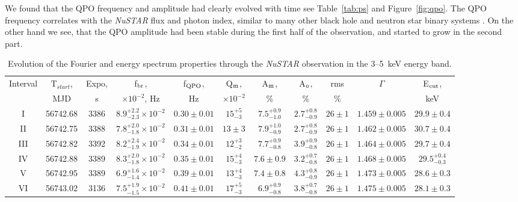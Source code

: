 \documentclass[a4paper,fleqn,usenatbib]{mnras}
\begin{document}
We found that the QPO frequency and amplitude had clearly evolved with time see Table~\ref{tab:ps} and Figure~\ref{fig:qpo}.
The QPO frequency correlates with the {\it NuSTAR} flux and photon index, similar to many other black hole and neutron star binary systems \citep[see, e.g.,][]{2003A&A...397..729V,2003A&A...407.1039P}.
On the other hand we see, that the QPO amplitude had been stable during the first half of the observation, and started to grow in the second part.

\begin{table}
\noindent
\centering
\caption{Evolution of the Fourier and energy spectrum properties through the {\it NuSTAR} observation in the 3--5~keV energy band.}
\label{tab:timing}
\centering
\begin{tabular}{|c|c|c|c|c|c|c|c|c|c|c|}
\hline\hline
Interval    & T$_{start}$,  & Expo,     & f$_{\rm br}$,                     & f$_{\rm QPO}$, & Q$_{\rm m}$,     & A$_{\rm m}$,  & A$_{\rm o}$,      & rms & $\Gamma$ & E$_{\rm cut}$, \\
            &  MJD          &  s        & $\times10^{-2}$, Hz               &  Hz            & $\times10^{-2}$  & \%            &  \%               &   \%       &          &  keV             \\
\hline
I           & 56742.68      & 3386      & $8.9_{-2.3}^{+2.2}\times10^{-2}$  & $0.30\pm0.01$ & $15_{-3}^{+5}$ & $7.5_{-1.0}^{+0.9}$ & $2.7_{-0.9}^{+0.8}$ & $26\pm1$ & $1.459\pm0.005$ & $29.9\pm0.4$ \\
II & 56742.75 & 3388 & $7.8_{-1.8}^{+2.0}\times10^{-2}$ & $0.31\pm0.01$ & $13\pm3$ & $7.9_{-0.9}^{+1.0}$ & $2.7_{-0.9}^{+0.8}$ & $26\pm1$ & $1.462\pm0.005$ & $30.7\pm0.4$ \\
III & 56742.82 & 3392 & $8.2_{-1.9}^{+2.4}\times10^{-2}$ & $0.34\pm0.01$ & $12_{-2}^{+3}$ & $7.7_{-0.8}^{+0.9}$ & $3.9_{-0.8}^{+0.9}$ & $26\pm1$ & $1.464\pm0.005$ & $29.7\pm0.4$ \\
IV & 56742.88 & 3389 & $8.3_{-1.8}^{+2.0}\times10^{-2}$ & $0.35\pm0.01$ & $15_{-3}^{+4}$ & $7.6\pm0.9$ & $3.2_{-0.8}^{+0.7}$ & $26\pm1$ & $1.468\pm0.005$ & $29.5_{-0.3}^{+0.4}$ \\
V & 56742.95 & 3389 & $6.9_{-1.4}^{+1.6}\times10^{-2}$ & $0.39\pm0.01$ & $13_{-3}^{+4}$ & $7.4\pm0.8$ & $4.3_{-0.9}^{+0.8}$ & $26\pm1$ & $1.473\pm0.005$ & $28.6\pm0.3$ \\
VI & 56743.02 & 3136 & $7.5_{-1.5}^{+1.9}\times10^{-2}$ & $0.41\pm0.01$ & $17_{-3}^{+5}$ & $6.9_{-0.8}^{+0.9}$ & $3.8_{-0.8}^{+0.7}$ & $26\pm1$ & $1.475\pm0.005$ & $28.1\pm0.3$ \\

\end{tabular}
\end{table}
\end{document}
